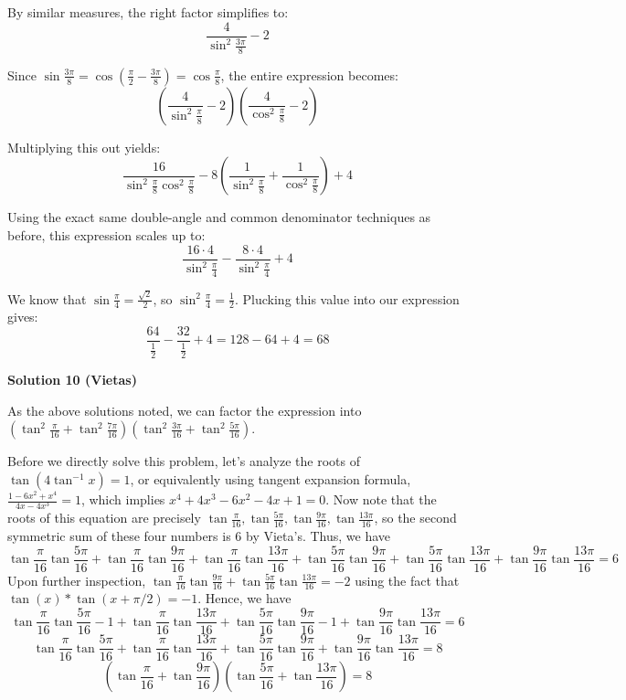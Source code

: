 \begin{enumerate}
 By similar measures, the right factor simplifies to:
 \[\frac{4}{\sin^2 \frac{3\pi}{8}} - 2\]

 Since $\sin \frac{3\pi}{8} = \cos\left(\frac{\pi}{2} - \frac{3\pi}{8}\right) = \cos \frac{\pi}{8}$, the entire expression becomes:
 \[\left(\frac{4}{\sin^2 \frac{\pi}{8}} - 2\right)\left(\frac{4}{\cos^2 \frac{\pi}{8}} - 2\right)\]

 Multiplying this out yields:
 \[\frac{16}{\sin^2 \frac{\pi}{8}\cos^2 \frac{\pi}{8}} - 8\left(\frac{1}{\sin^2 \frac{\pi}{8}} + \frac{1}{\cos^2 \frac{\pi}{8}}\right) + 4\]

 Using the exact same double-angle and common denominator techniques as before, this expression scales up to:
 \[\frac{16 \cdot 4}{\sin^2 \frac{\pi}{4}} - \frac{8 \cdot 4}{\sin^2 \frac{\pi}{4}} + 4\]

 We know that $\sin \frac{\pi}{4} = \frac{\sqrt{2}}{2}$, so $\sin^2 \frac{\pi}{4} = \frac{1}{2}$. Plucking this value into our expression gives:
 \[\frac{64}{\frac{1}{2}} - \frac{32}{\frac{1}{2}} + 4 = 128 - 64 + 4 = \boxed{68}\]




\textbf{Solution 10 (Vietas)}

As the above solutions noted, we can factor the expression into $(\tan^2\frac{\pi}{16}+\tan^2 \frac{7\pi}{16})(\tan^2\frac{3\pi}{16}+\tan^2 \frac{5\pi}{16})$.

 Before we directly solve this problem, let's analyze the roots of $\tan(4\tan^{-1}{x}) = 1$, or equivalently using tangent expansion formula, $\frac{1-6x^2+x^4}{4x-4x^3}=1$, which implies $x^4+4x^3-6x^2-4x+1=0$. Now note that the roots of this equation are precisely $\tan\frac{\pi}{16}, \tan\frac{5\pi}{16}, \tan\frac{9\pi}{16}, \tan\frac{13\pi}{16}$, so the second symmetric sum of these four numbers is $6$ by Vieta's. Thus, we have 
 \[\tan\frac{\pi}{16}\tan\frac{5\pi}{16}+\tan\frac{\pi}{16}\tan\frac{9\pi}{16}+\tan\frac{\pi}{16}\tan\frac{13\pi}{16}+\tan\frac{5\pi}{16}\tan\frac{9\pi}{16}+\tan\frac{5\pi}{16}\tan\frac{13\pi}{16}+\tan\frac{9\pi}{16}\tan\frac{13\pi}{16}=6\]Upon further inspection, $\tan\frac{\pi}{16}\tan\frac{9\pi}{16}+\tan\frac{5\pi}{16}\tan\frac{13\pi}{16}=-2$ using the fact that $\tan(x)*\tan(x + \pi/2) = -1$. Hence, we have 
 \[\tan\frac{\pi}{16}\tan\frac{5\pi}{16}-1+\tan\frac{\pi}{16}\tan\frac{13\pi}{16}+\tan\frac{5\pi}{16}\tan\frac{9\pi}{16}-1+\tan\frac{9\pi}{16}\tan\frac{13\pi}{16}=6\]
 \[\tan\frac{\pi}{16}\tan\frac{5\pi}{16}+\tan\frac{\pi}{16}\tan\frac{13\pi}{16}+\tan\frac{5\pi}{16}\tan\frac{9\pi}{16}+\tan\frac{9\pi}{16}\tan\frac{13\pi}{16}=8\]
 \[(\tan\frac{\pi}{16}+\tan\frac{9\pi}{16})(\tan\frac{5\pi}{16}+\tan\frac{13\pi}{16})=8\]


\end{enumerate}
